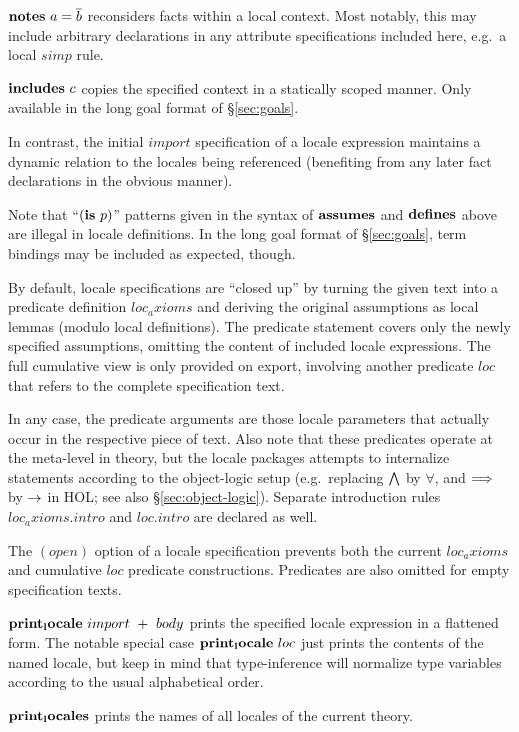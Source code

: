 \begin{descr}
\begin{descr}
  \item [$\NOTES{a}{\vec b}$] reconsiders facts within a local context.  Most
    notably, this may include arbitrary declarations in any attribute
    specifications included here, e.g.\ a local $simp$ rule.

  \item [${\mathord{\mathbf{includes}}}~c$] copies the specified context in a statically scoped
    manner.  Only available in the long goal format of \S\ref{sec:goals}.

    In contrast, the initial $import$ specification of a locale expression
    maintains a dynamic relation to the locales being referenced (benefiting
    from any later fact declarations in the obvious manner).
  \end{descr}
  
  Note that ``$({\mathord{\mathbf{is}}}~p)$'' patterns given in the syntax of ${\mathord{\mathbf{assumes}}}$ and
  ${\mathord{\mathbf{defines}}}$ above are illegal in locale definitions.  In the long goal
  format of \S\ref{sec:goals}, term bindings may be included as expected,
  though.
  
  \medskip By default, locale specifications are ``closed up'' by turning the
  given text into a predicate definition $loc_axioms$ and deriving the
  original assumptions as local lemmas (modulo local definitions).  The
  predicate statement covers only the newly specified assumptions, omitting
  the content of included locale expressions.  The full cumulative view is
  only provided on export, involving another predicate $loc$ that refers to
  the complete specification text.
  
  In any case, the predicate arguments are those locale parameters that
  actually occur in the respective piece of text.  Also note that these
  predicates operate at the meta-level in theory, but the locale packages
  attempts to internalize statements according to the object-logic setup
  (e.g.\ replacing $\bigwedge$ by $\forall$, and $\Longrightarrow$ by $\rightarrow$ in HOL; see
  also \S\ref{sec:object-logic}).  Separate introduction rules
  $loc_axioms.intro$ and $loc.intro$ are declared as well.
  
  The $(open)$ option of a locale specification prevents both the current
  $loc_axioms$ and cumulative $loc$ predicate constructions.  Predicates are
  also omitted for empty specification texts.

\item [${\mathord{\mathbf{print_locale}}}~import~+~body$] prints the specified locale
  expression in a flattened form.  The notable special case
  ${\mathord{\mathbf{print_locale}}}~loc$ just prints the contents of the named
  locale, but keep in mind that type-inference will normalize type variables
  according to the usual alphabetical order.

\item [${\mathord{\mathbf{print_locales}}}$] prints the names of all locales of the
  current theory.

\end{descr}



